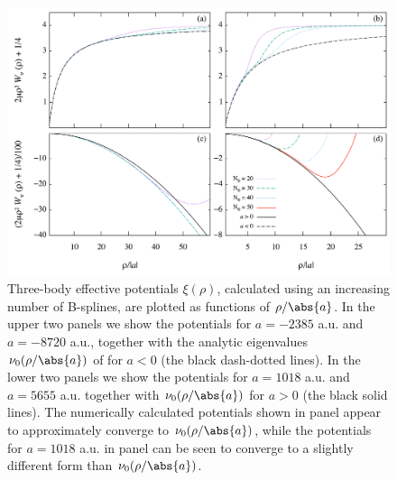 \begin{figure}[htbp!]
	\includegraphics[width=\linewidth]{conv2815.pdf}
	\caption{Three-body effective potentials $\xi(\rho)$, calculated using an increasing number of B-splines, are plotted as functions of $\rho/\abs{a}$. In the upper two panels we show the potentials for  $a=-2385$ a.u. and  $a=-8720$ a.u., together with the analytic eigenvalues $\nu_0(\rho/\abs{a})$ of  for $a<0$ (the black dash-dotted lines). In the lower two panels we show the potentials for  $a=1018$ a.u. and  $a=5655$ a.u. together with $\nu_0(\rho/\abs{a})$ for $a>0$ (the black solid lines). The numerically calculated potentials shown in panel  appear to approximately converge to $\nu_0(\rho/\abs{a})$, while the potentials for $a=1018$ a.u. in panel  can be seen to converge to a slightly different form than $\nu_0(\rho/\abs{a})$.}\label{fig:conv}
\end{figure}

